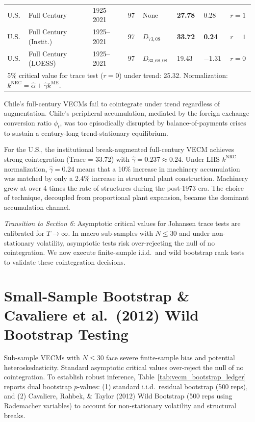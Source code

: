 \documentclass[11pt,a4paper]{article}
\begin{document}
\begin{table}[h!]
\begin{tabular}{p{1.4cm} p{3.4cm} p{1.6cm} p{0.6cm} p{1.6cm} p{1.2cm} p{1.2cm} p{2.8cm}}
U.S. & Full Century & 1925--2021 & 97 & None & \textbf{27.78} & 0.28 & \textbf{$r=1$} \\
U.S. & Full Century (Instit.) & 1925--2021 & 97 & $D_{73,08}$ & \textbf{33.72} & \textbf{0.24} & \textbf{$r=1$} \\
U.S. & Full Century (LOESS) & 1925--2021 & 97 & $D_{33,68,08}$ & 19.43 & $-1.31$ & $r=0$ \\
\bottomrule
\multicolumn{8}{p{14.2cm}}{\footnotesize 5\% critical value for trace test ($r=0$) under trend: 25.32. Normalization: $k^{\text{NRC}} = \hat{\alpha} + \hat{\gamma} k^{\text{ME}}$.}
\end{tabular}
\end{table}

Chile's full-century VECMs fail to cointegrate under trend regardless of augmentation. Chile's peripheral accumulation, mediated by the foreign exchange conversion ratio $\phi_t$, was too episodically disrupted by balance-of-payments crises to sustain a century-long trend-stationary equilibrium.

For the U.S., the institutional break-augmented full-century VECM achieves strong cointegration (Trace = 33.72) with $\hat{\gamma} = 0.237 \approx 0.24$. Under LHS $k^{\text{NRC}}$ normalization, $\hat{\gamma} = 0.24$ means that a 10\% increase in machinery accumulation was matched by only a 2.4\% increase in structural plant construction. Machinery grew at over 4 times the rate of structures during the post-1973 era. The choice of technique, decoupled from proportional plant expansion, became the dominant accumulation channel.

\textit{Transition to Section 6}: Asymptotic critical values for Johansen trace tests are calibrated for $T \to \infty$. In macro sub-samples with $N \le 30$ and under non-stationary volatility, asymptotic tests risk over-rejecting the null of no cointegration. We now execute finite-sample i.i.d.\ and wild bootstrap rank tests to validate these cointegration decisions.

\FloatBarrier
\section{Small-Sample Bootstrap \& Cavaliere et al.\ (2012) Wild Bootstrap Testing}

Sub-sample VECMs with $N \le 30$ face severe finite-sample bias and potential heteroskedasticity. Standard asymptotic critical values over-reject the null of no cointegration. To establish robust inference, Table~\ref{tab:vecm_bootstrap_ledger} reports dual bootstrap $p$-values: (1) standard i.i.d.\ residual bootstrap (500 reps), and (2) Cavaliere, Rahbek, \& Taylor (2012) Wild Bootstrap (500 reps using Rademacher variables) to account for non-stationary volatility and structural breaks.
\end{document}
